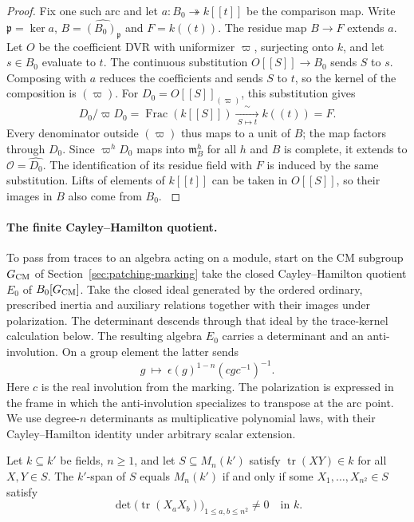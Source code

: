 \begin{proof}
Fix one such arc and let \(a:B_0\twoheadrightarrow k[[t]]\)
be the comparison map. Write \(\mathfrak p=\ker a\),
\(B=\widehat{(B_0)_{\mathfrak p}}\) and \(F=k((t))\).
The residue map \(B\to F\) extends \(a\).
Let \(O\) be the coefficient DVR with uniformizer \(\varpi\),
surjecting onto \(k\), and let \(s\in B_0\) evaluate to \(t\).
The continuous substitution \(O[[S]]\to B_0\) sends \(S\) to
\(s\). Composing with \(a\) reduces the coefficients and
sends \(S\) to \(t\), so the kernel of the composition is
\((\varpi)\). For \(D_0=O[[S]]_{(\varpi)}\), this substitution gives
\[
 D_0/\varpi D_0=\operatorname{Frac}(k[[S]])
        \xrightarrow[\ S\mapsto t\ ]{\ \sim\ } k((t))=F .
\]
Every denominator outside \((\varpi)\) thus maps to a unit of \(B\); the map factors through \(D_0\). Since \(\varpi^h D_0\) maps into \(\mathfrak m_B^h\) for all \(h\) and \(B\) is complete, it extends to \(\mathcal O=\widehat{D_0}\). The identification
of its residue field with \(F\) is induced by the same
substitution. Lifts of elements of
\(k[[t]]\) can be taken in \(O[[S]]\), so their images in \(B\)
also come from \(B_0\).
\label{cor:ordinary-patching-matrices-1}

\end{proof}

\paragraph{The finite Cayley--Hamilton quotient.}
To pass from traces to an algebra acting on a module, start on the CM subgroup \(G_{\rm CM}\) of Section~\ref{sec:patching-marking}
take the closed Cayley--Hamilton quotient \(E_0\) of
\(B_0[G_{\rm CM}]\). Take the closed ideal generated by the ordered ordinary, prescribed inertia and auxiliary relations together with their images under polarization. The determinant descends through that ideal by
the trace-kernel calculation below. The resulting algebra \(E_0\) carries a determinant and an anti-involution. On a group element the latter sends \[ g\ \longmapsto\ \epsilon(g)^{1-n}(cgc^{-1})^{-1}. \] Here \(c\) is the real involution from the marking. The polarization is expressed in the frame in which the anti-involution specializes to transpose at the arc point. We use degree-\(n\)
determinants as multiplicative polynomial laws, with their
Cayley--Hamilton identity under arbitrary scalar extension.
\cite{chenevier}\label{cor:ordinary-patching-matrices-2}

\begin{auxlemma}\label{lem:matrix-span-by-traces}
Let \(k\subseteq k'\) be fields, \(n\ge1\), and let \(S\subseteq M_n(k')\) satisfy \(\operatorname{tr}(XY)\in k\) for all \(X,Y\in S\).
The \(k'\)-span of \(S\) equals \(M_n(k')\) if and only if some \(X_1,\ldots,X_{n^2}\in S\) satisfy
\[
 \det\bigl(\operatorname{tr}(X_aX_b)\bigr)_{1\le a,b\le n^2}\ne0\quad\text{in }k.
\]
\end{auxlemma}

